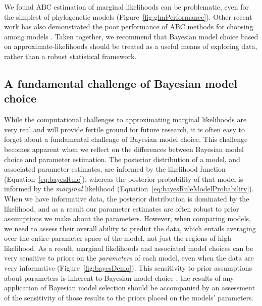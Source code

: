 We found ABC estimation of marginal likelihoods can be problematic,
even for the simplest of phylogenetic models
(Figure~\ref{fig:glmPerformance}).
Other recent work has also demonstrated the poor performance of ABC methods for
choosing among models \citep{Robert2011,Oaks2012,Oaks2014reply}.
Taken together, we recommend that Bayesian model choice based on
approximate-likelihoods should be treated as a useful means of exploring data,
rather than a robust statistical framework.


\subsection{A fundamental challenge of Bayesian model choice}

While the computational challenges to approximating marginal likelihoods
are very real and will provide fertile ground for future research,
it is often easy to forget about a fundamental challenge of Bayesian model
choice.
This challenge becomes apparent when we reflect on the differences between
Bayesian model choice and parameter estimation.
The posterior distribution of a model, and associated parameter estimates, are
informed by the likelihood function (Equation~\ref{eq:bayesRule}),
whereas the posterior probability of that model is informed by the
\emph{marginal} likelihood
(Equation~\ref{eq:bayesRuleModelProbability}).
When we have informative data, the posterior distribution is dominated by the
likelihood, and as a result our parameter estimates are often robust to prior
assumptions we make about the parameters.
However, when comparing models, we need to assess their overall ability to
predict the data, which entails averaging over the entire parameter space of
the model, not just the regions of high likelihood.
As a result, marginal likelihoods and associated model choices can be very
sensitive to priors on the \emph{parameters} of each model, even when the data
are very informative (Figure~\ref{fig:bayesDemo}).
This sensitivity to prior assumptions about parameters is inherent to Bayesian
model choice
, the results of any application of Bayesian
model selection should be accompanied by an assessment of the sensitivity of
those results to the priors placed on the models' parameters.


